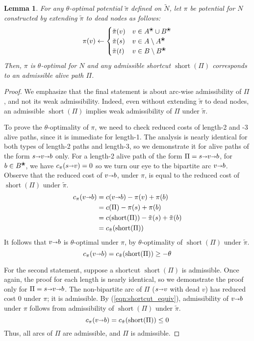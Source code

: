 \documentclass[11pt]{article}
\def\arcto{\mathord\shortrightarrow}
\def\arc#1#2{#1\arcto#2}
\def\short{\operatorname{short}}
\def\alive#1{{#1}^\text{\ding{96}}}
\def\dead#1{{#1} \setminus \alive{#1}}
\newtheorem{lemma}{Lemma}[section]
\numberwithin{figure}{section}
\begin{document}
\begin{lemma}
\label{lemma:shortcut_correct}
For any $\theta$-optimal potential $\tilde{\pi}$ defined on $\tilde{N}$,
let $\pi$ be potential for $N$ constructed by extending $\tilde{\pi}$ to
dead nodes as follows:
\[
\pi(v) \gets \begin{cases}
	\tilde{\pi}(v) & v \in \alive{A} \cup \alive{B} \\
	\tilde{\pi}(s) & v \in \dead{A} \\
	\tilde{\pi}(t) & v \in \dead{B}
\end{cases}
\]
Then, $\pi$ is $\theta$-optimal for $N$ and any admissible shortcut
$\short(\Pi)$ corresponds to an admissible alive path $\Pi$.
\end{lemma}
\begin{proof}
We emphasize that the final statement is about arc-wise admissibility of $\Pi$,
and not its weak admissibility.
Indeed, even without extending $\tilde{\pi}$ to dead nodes, an admissible
$\short(\Pi)$ implies weak admissibility of $\Pi$ under $\tilde{\pi}$.

To prove the $\theta$-optimality of $\pi$, we need to check reduced costs of
length-2 and -3 alive paths, since it is immediate for length-1.
The analysis is nearly identical for both types of length-2 paths and length-3,
so we demonstrate it for alive paths of the form $s \arcto v \arcto b$ only.
For a length-2 alive path of the form $\Pi = s \arcto v \arcto b$,
for $b \in \alive{B}$, we have $c_\pi(\arc sv) = 0$ so we turn our eye to
the bipartite arc $\arc vb$.
Observe that the reduced cost of $\arc vb$, under $\pi$, is equal to the
reduced cost of $\short(\Pi)$ under $\tilde{\pi}$.
\begin{equation}
\label{eqn:shortcut_equiv}
\begin{aligned}
c_\pi(\arc vb) &= c(\arc vb) - \pi(v) + \pi(b) \\
	&= c(\Pi) - \pi(s) + \pi(b) \\
	&= c(\short(\Pi)) - \tilde{\pi}(s) + \tilde{\pi}(b) \\
	&= c_{\tilde{\pi}}(\short(\Pi))
\end{aligned}
\end{equation}
It follows that $\arc vb$ is $\theta$-optimal under $\pi$, by
$\theta$-optimality of $\short(\Pi)$ under $\tilde{\pi}$.
\[
c_\pi(\arc vb) = c_{\tilde{\pi}}(\short(\Pi)) \geq -\theta
\]

For the second statement, suppose a shortcut $\short(\Pi)$ is admissible.
Once again, the proof for each length is nearly identical, so we demonstrate
the proof only for $\Pi = s \arcto v \arcto b$.
The non-bipartite arc of $\Pi$ ($\arc sv$ with dead $v$) has reduced cost 0
under $\pi$; it is admissible.
By (\ref{eqn:shortcut_equiv}), admissibility of $\arc vb$ under $\pi$ follows
from admissibility of $\short(\Pi)$ under $\tilde{\pi}$.
\[
c_\pi(\arc vb) = c_{\tilde{\pi}}(\short(\Pi)) \leq 0
\]
Thus, all arcs of $\Pi$ are admissible, and $\Pi$ is admissible.
\end{proof}
\end{document}
